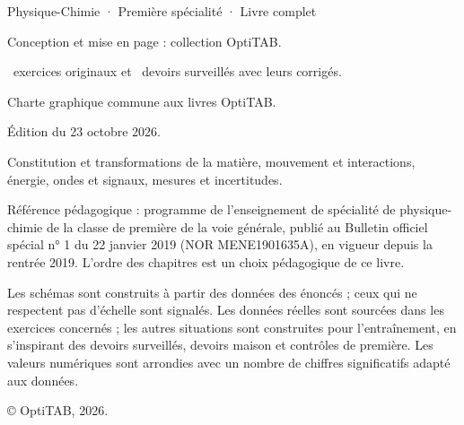 \thispagestyle{empty}
\vspace*{\fill}
\begin{minipage}{128mm}
\fontsize{9}{13}\selectfont\color{otMuted}
{\otSemi\color{otInk}Physique-Chimie · Première spécialité · Livre complet}\par
\vspace{3mm}
Conception et mise en page : collection OptiTAB.\par
\otNbExosTotal\ exercices originaux et \otNbSujetsLettres\ devoirs surveillés avec leurs corrigés.\par
Charte graphique commune aux livres OptiTAB.\par
\vspace{5mm}
Édition du 23 octobre 2026.\par
Constitution et transformations de la matière, mouvement et interactions,
énergie, ondes et signaux, mesures et incertitudes.\par
\vspace{5mm}
Référence pédagogique : programme de l'enseignement de spécialité de physique-chimie
de la classe de première de la voie générale, publié au Bulletin officiel spécial n° 1
du 22 janvier 2019 (NOR MENE1901635A), en vigueur depuis la rentrée 2019.
L'ordre des chapitres est un choix pédagogique de ce livre.\par
\vspace{5mm}
Les schémas sont construits à partir des données des énoncés ; ceux qui ne
respectent pas d'échelle sont signalés. Les données réelles sont sourcées dans
les exercices concernés ; les autres situations sont construites pour l'entraînement,
en s'inspirant des devoirs surveillés, devoirs maison et contrôles de première.
Les valeurs numériques sont arrondies avec un nombre de chiffres significatifs adapté aux données.\par
\vspace{5mm}
© OptiTAB, 2026.\par
\otSite
\end{minipage}
\clearpage
